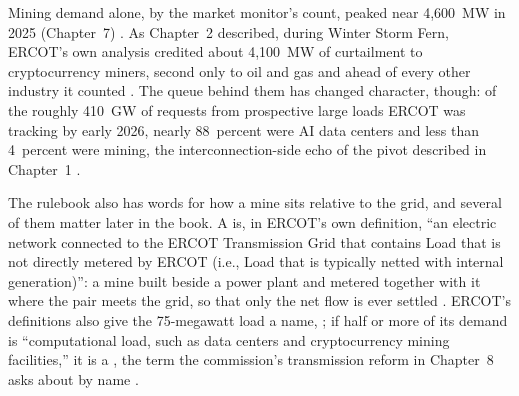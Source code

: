 Mining demand alone, by the market monitor's count, peaked near 4,600~MW in 2025 (Chapter~7) \autocite{potomac2026somercot}. %
As Chapter~2 described, during Winter Storm Fern, ERCOT's own analysis credited about 4,100~MW of curtailment to cryptocurrency miners, second only to oil and gas and ahead of every other industry it counted \autocite{ERCOTMonthlyJan2026}. The queue behind them has changed character, though: of the roughly 410~GW of requests from prospective large loads ERCOT was tracking by early 2026, nearly 88~percent were AI data centers and less than 4~percent were mining, the interconnection-side echo of the pivot described in Chapter~1 \autocite{vegas2026senateupdate}. %

The rulebook also has words for how a mine sits relative to the grid, and several of them matter later in the book. A  is, in ERCOT's own definition, ``an electric network connected to the ERCOT Transmission Grid that contains Load that is not directly metered by ERCOT (i.e., Load that is typically netted with internal generation)'': a mine built beside a power plant and metered together with it where the pair meets the grid, so that only the net flow is ever settled \autocite{ercot2026protocols}. %
ERCOT's definitions also give the 75-megawatt load a name, ; if half or more of its demand is ``computational load, such as data centers and cryptocurrency mining facilities,'' it is a , the term the commission's transmission reform in Chapter~8 asks about by name \autocite{ercot2026protocols}. %


